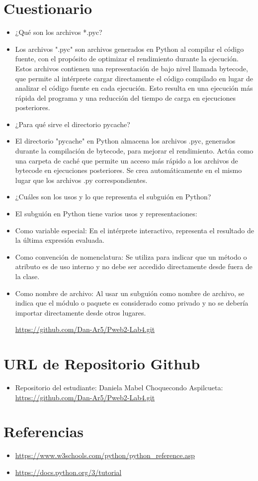 \documentclass{article}
\begin{document}
	\section{Cuestionario}
	\begin{itemize}
 \item ¿Qué son los archivos *.pyc? 
  \item Los archivos ".pyc" son archivos generados en Python al compilar el código fuente, con el propósito de optimizar el rendimiento durante la ejecución. Estos archivos contienen una representación de bajo nivel llamada bytecode, que permite al intérprete cargar directamente el código compilado en lugar de analizar el código fuente en cada ejecución. Esto resulta en una ejecución más rápida del programa y una reducción del tiempo de carga en ejecuciones posteriores.
  
\item ¿Para qué sirve el directorio pycache?
  \item El directorio "pycache" en Python almacena los archivos .pyc, generados durante la compilación de bytecode, para mejorar el rendimiento. Actúa como una carpeta de caché que permite un acceso más rápido a los archivos de bytecode en ejecuciones posteriores. Se crea automáticamente en el mismo lugar que los archivos .py correspondientes.

  \item ¿Cuáles son los usos y lo que representa el subguión en Python?
  \item El subguión en Python tiene varios usos y representaciones:
  \item Como variable especial: En el intérprete interactivo, representa el resultado de la última expresión evaluada.
  \item Como convención de nomenclatura: Se utiliza para indicar que un método o atributo es de uso interno y no debe ser accedido directamente desde fuera de la clase.
  \item Como nombre de archivo: Al usar un subguión como nombre de archivo, se indica que el módulo o paquete es considerado como privado y no se debería importar directamente desde otros lugares.

\url{https://github.com/Dan-Ar5/Pweb2-Lab4.git}
	\end{itemize}
 
 \item 
	\section{URL de Repositorio Github}
	\begin{itemize}
 \item Repositorio del estudiante: Daniela Mabel Choquecondo Aspilcueta:    
\url{https://github.com/Dan-Ar5/Pweb2-Lab4.git}
	\end{itemize}

\section{Referencias}
\begin{itemize}			
	\item \url{https://www.w3schools.com/python/python_reference.asp}
	\item \url{https://docs.python.org/3/tutorial}
\end{itemize}	
	
%
%
%
			
\end{document}
